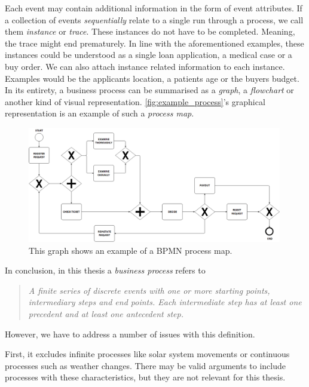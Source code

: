\documentclass[./../../paper.tex]{subfiles}
\begin{document}
Each \gls{event} may contain additional information in the form of event attributes. If a collection of events \emph{sequentially} relate to a single run through a process, we call them \emph{\gls{instance}} or \emph{trace}. These instances do not have to be completed. Meaning, the trace might end prematurely. In line with the aforementioned examples, these \glspl{instance} could be understood as a single loan application, a medical case or a buy order. We can also attach \gls{instance} related information to each instance. Examples would be the applicants location, a patients age or the buyers budget. In its entirety, a business process can be summarised as a \emph{graph}, a \emph{flowchart} or another kind of visual representation. \autoref{fig:example_process}'s graphical representation is an example of such a \emph{process map}\autocite{vanderaalst_ProcessMiningManifesto_2012}. 


\begin{figure}[htb]
    \centering
    \includegraphics[width=0.99\textwidth]{figures/example_process.png}
    \caption{This graph shows an example of a \gls{BPMN} process map.}
    \label{fig:example_process}
\end{figure}



In conclusion, in this thesis a \emph{business process} refers to \begin{quote}
    \emph{A finite series of discrete events with one or more starting points, intermediary steps and end points. Each intermediate step has at least one precedent and at least one antecedent step.}
\end{quote}
However, we have to address a number of issues with this definition.

First, it excludes infinite processes like solar system movements or continuous processes such as weather changes. There may be valid arguments to include processes with these characteristics, but they are not relevant for this thesis.
\end{document}
